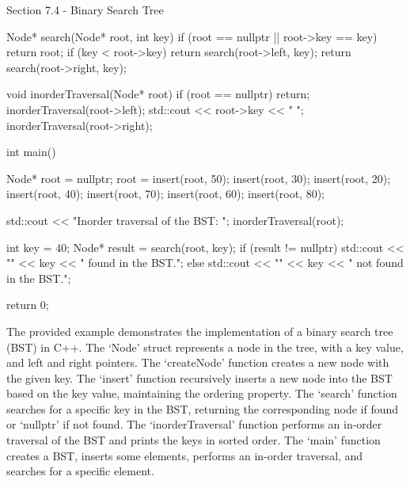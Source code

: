 \begin{notes}{Section 7.4 - Binary Search Tree}
\begin{highlight}
\begin{code}[C++]
    Node* search(Node* root, int key) {
        if (root == nullptr || root->key == key) {
            return root;
        }
        if (key < root->key) {
            return search(root->left, key);
        }
        return search(root->right, key);
    }
    
    void inorderTraversal(Node* root) {
        if (root == nullptr) {
            return;
        }
        inorderTraversal(root->left);
        std::cout << root->key << " ";
        inorderTraversal(root->right);
    }
    
    int main() {
        Node* root = nullptr;
        root = insert(root, 50);
        insert(root, 30);
        insert(root, 20);
        insert(root, 40);
        insert(root, 70);
        insert(root, 60);
        insert(root, 80);
    
        std::cout << "Inorder traversal of the BST: ";
        inorderTraversal(root);
    
        int key = 40;
        Node* result = search(root, key);
        if (result != nullptr) {
            std::cout << "\nElement " << key << " found in the BST.";
        } else {
            std::cout << "\nElement " << key << " not found in the BST.";
        }
    
        return 0;
    }
    \end{code}
        The provided example demonstrates the implementation of a binary search tree (BST) in C++. The `Node' struct represents a node in the tree, with a key value, and left and right pointers. The `createNode' function creates a new node with the given key. The `insert' function recursively inserts a new node into the BST based on 
        the key value, maintaining the ordering property. The `search' function searches for a specific key in the BST, returning the corresponding node if found or `nullptr' if not found. The `inorderTraversal' function performs an in-order traversal of the BST and prints the keys in sorted order. The `main' function creates a BST, inserts 
        some elements, performs an in-order traversal, and searches for a specific element.
    \end{highlight}
\end{notes}

